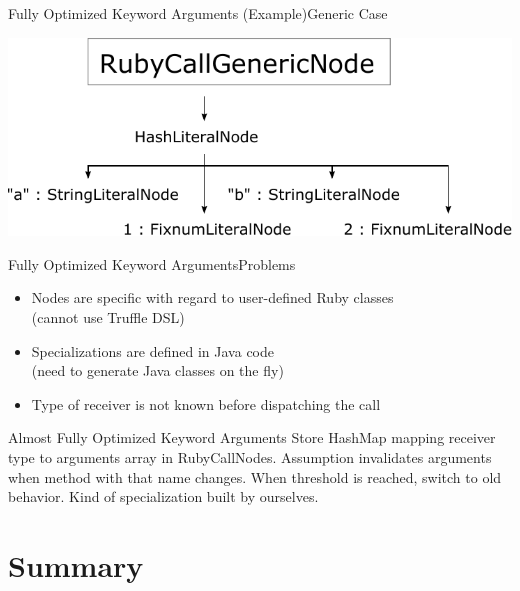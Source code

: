 \documentclass[xcolor=dvipsname,handout]{beamer} %
\begin{document}
\begin{frame}{Fully Optimized Keyword Arguments (Example)}{Generic Case}
\begin{table}
    \centering
    \includegraphics[width=\textwidth]{kwargs_generic.pdf}
\end{table}
\end{frame}

\begin{frame}{Fully Optimized Keyword Arguments}{Problems}
\begin{itemize}
    \item Nodes are specific with regard to user-defined Ruby classes \\ (cannot use Truffle DSL)
    \item Specializations are defined in Java code \\ (need to generate Java classes on the fly)
    \item Type of receiver is not known before dispatching the call
\end{itemize}
\end{frame}

\begin{frame}{Almost Fully Optimized Keyword Arguments}
Store HashMap mapping receiver type to arguments array in RubyCallNodes. Assumption invalidates arguments when method with that name changes. When threshold is reached, switch to old behavior. Kind of specialization built by ourselves.
\end{frame}


\section{Summary}
\end{document}
